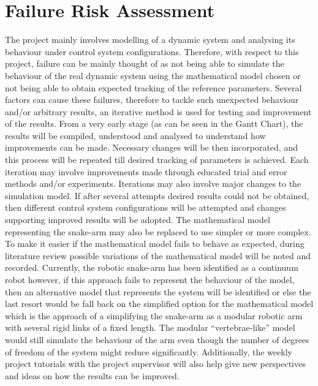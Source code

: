\documentclass[a4paper,12pt]{report}
\begin{document}
\section{Failure Risk Assessment}
The project mainly involves modelling of a dynamic system and analysing its behaviour under control system configurations. Therefore, with respect to this project, failure can be mainly thought of as not being able to simulate the behaviour of the real dynamic system using the mathematical model chosen or not being able to obtain expected tracking of the reference parameters.
Several factors can cause these failures, therefore to tackle such unexpected behaviour and/or arbitrary results, an iterative method is used for testing and improvement of the results. From a very early stage (as can be seen in the Gantt Chart), the results will be compiled, understood and analysed to understand how improvements can be made. Necessary changes will be then incorporated, and this process will be repeated till desired tracking of parameters is achieved. Each iteration may involve improvements made through educated trial and error methods and/or experiments. 
Iterations may also involve major changes to the simulation model. If after several attempts desired results could not be obtained, then different control system configurations will be attempted and changes supporting improved results will be adopted. The mathematical model representing the snake-arm may also be replaced to use simpler or more complex. To make it easier if the mathematical model fails to behave as expected, during literature review possible variations of the mathematical model will be noted and recorded.
Currently, the robotic snake-arm has been identified as a continuum robot however, if this approach fails to represent the behaviour of the model, then an alternative model that represents the system will be identified or else the last resort would be fall back on the simplified option for the mathematical model which is the approach of a simplifying the snake-arm as a modular robotic arm with several rigid links of a fixed length. The modular “vertebrae-like” model would still simulate the behaviour of the arm even though the number of degrees of freedom of the system might reduce significantly.
Additionally, the weekly project tutorials with the project supervisor will also help give new perspectives and ideas on how the results can be improved.
\end{document}
